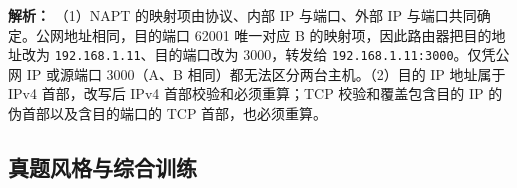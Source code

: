 \begin{enumerate}
\ifshowsolutions\par\noindent\textbf{解析：} （1）NAPT 的映射项由协议、内部 IP 与端口、外部 IP 与端口共同确定。公网地址相同，目的端口 62001 唯一对应 B 的映射项，因此路由器把目的地址改为 \texttt{192.168.1.11}、目的端口改为 3000，转发给 \texttt{192.168.1.11:3000}。仅凭公网 IP 或源端口 3000（A、B 相同）都无法区分两台主机。（2）目的 IP 地址属于 IPv4 首部，改写后 IPv4 首部校验和必须重算；TCP 校验和覆盖包含目的 IP 的伪首部以及含目的端口的 TCP 首部，也必须重算。\else \answerarea[6] \fi

\end{enumerate}

\subsection{真题风格与综合训练}

